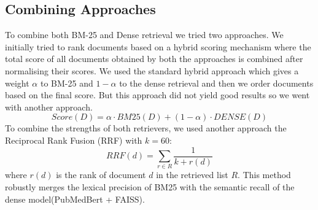 \documentclass[11pt]{article}
\begin{document}
\subsection{Combining Approaches}
To combine both BM-25 and Dense retrieval we tried two approaches. We initially tried to rank documents based on a hybrid scoring mechanism where the total score of all documents obtained by both the approaches is combined after normalising their scores. We used the standard hybrid approach which gives a weight $\alpha$ to BM-25 and $1-\alpha$ to the dense retrieval and then we order documents based on the final score. But this approach did not yield good results so we went with another approach.
\[
Score(D) = \alpha \cdot BM25(D) + (1-\alpha)\cdot DENSE(D)
\]
To combine the strengths of both retrievers, we used another approach the Reciprocal Rank Fusion (RRF) with $k=60$:
\begin{equation}
    RRF(d) = \sum_{r \in R} \frac{1}{k + r(d)}
\end{equation}
where $r(d)$ is the rank of document $d$ in the retrieved list $R$. This method robustly merges the lexical precision of BM25 with the semantic recall of the dense model(PubMedBert + FAISS).
\end{document}
